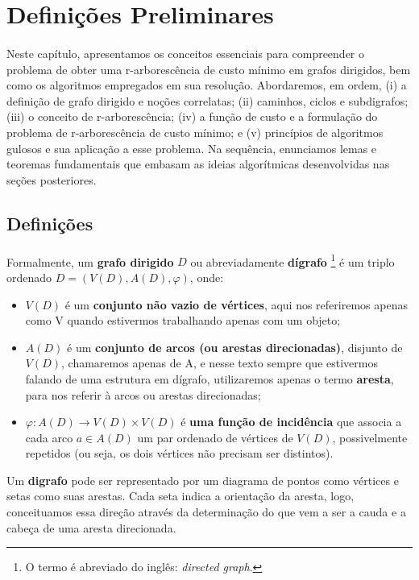 \documentclass[12pt,a4paper]{article}
\begin{document}
\section{Definições Preliminares}
\paragraph{}
Neste capítulo, apresentamos os conceitos essenciais para compreender o problema de obter uma r-arborescência de custo mínimo em grafos dirigidos, bem como os algoritmos empregados em sua resolução. Abordaremos, em ordem, (i) a definição de grafo dirigido e noções correlatas; (ii) caminhos, ciclos e subdigrafos; (iii) o conceito de r-arborescência; (iv) a função de custo e a formulação do problema de r-arborescência de custo mínimo; e (v) princípios de algoritmos gulosos e sua aplicação a esse problema. Na sequência, enunciamos lemas e teoremas fundamentais que embasam as ideias algorítmicas desenvolvidas nas seções posteriores.

\subsection{Definições}
\paragraph{}
Formalmente, um \textbf{grafo dirigido} \(D\) ou abreviadamente \textbf{dígrafo} 
\footnote{O termo é abreviado do inglês: \textit{directed graph}.} é um triplo ordenado \(D = (V(D), A(D), \varphi)\), onde:
\begin{itemize}
    \item \(V(D)\) é um \textbf{conjunto não vazio de vértices}, aqui nos referiremos apenas como V quando estivermos trabalhando apenas com um objeto;
    \item \(A(D)\) é um \textbf{conjunto de arcos (ou arestas direcionadas)}, disjunto de \(V(D)\), chamaremos apenas de A, e nesse texto sempre que estivermos falando de uma estrutura em dígrafo, utilizaremos apenas o termo \textbf{aresta}, para nos referir à arcos ou arestas direcionadas;
    \item \(\varphi: A(D) \to V(D) \times V(D)\) é \textbf{uma função de incidência} que associa a cada arco \(a \in A(D)\) um par ordenado de vértices de \(V(D)\), possivelmente repetidos (ou seja, os dois vértices não precisam ser distintos).
\end{itemize}

Um \textbf{digrafo} pode ser representado por um diagrama de pontos como vértices e setas como suas arestas. Cada seta indica a orientação da aresta, logo, conceituamos essa direção através da determinação do que vem a ser a cauda e a cabeça de uma aresta direcionada.
\end{document}
